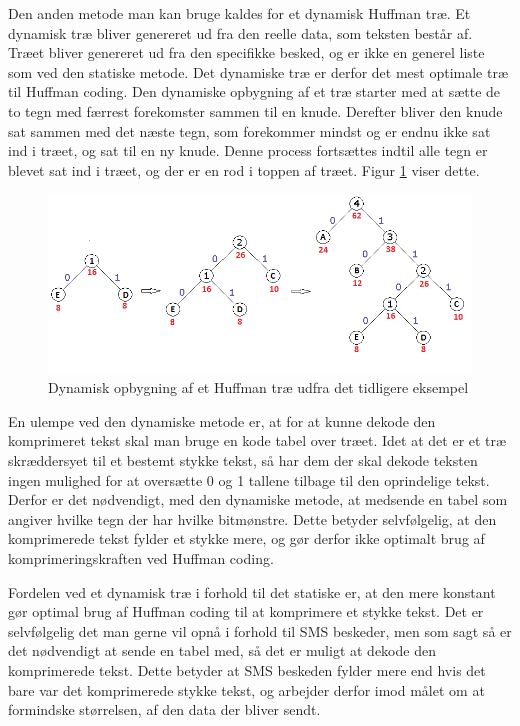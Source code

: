 Den anden metode man kan bruge kaldes for et dynamisk Huffman træ. Et dynamisk træ bliver genereret ud fra den reelle data, som teksten består af. Træet bliver genereret ud fra den specifikke besked, og er ikke en generel liste som ved den statiske metode. Det dynamiske træ er derfor det mest optimale træ til Huffman coding. Den dynamiske opbygning af et træ starter med at sætte de to tegn med færrest forekomster sammen til en knude. Derefter bliver den knude sat sammen med det næste tegn, som forekommer mindst og er endnu ikke sat ind i træet, og sat til en ny knude. Denne process fortsættes indtil alle tegn er blevet sat ind i træet, og der er en rod i toppen af træet. Figur \ref{fig:dynamic_tree} viser dette.

\begin{figure}[H]
\centering
\includegraphics[width=\linewidth]{Billeder/dynamisk.png}
\caption{Dynamisk opbygning af et Huffman træ udfra det tidligere eksempel \cite{Hufftree_1}}
\label{fig:dynamic_tree}
\end{figure}

En ulempe ved den dynamiske metode er, at for at kunne dekode den komprimeret tekst skal man bruge en kode tabel over træet. Idet at det er et træ skræddersyet til et bestemt stykke tekst, så har dem der skal dekode teksten ingen mulighed for at oversætte 0 og 1 tallene tilbage til den oprindelige tekst. Derfor er det nødvendigt, med den dynamiske metode, at medsende en tabel som angiver hvilke tegn der har hvilke bitmønstre. Dette betyder selvfølgelig, at den komprimerede tekst fylder et stykke mere, og gør derfor ikke optimalt brug af komprimeringskraften ved Huffman coding. \cite{Hufftree_4}

Fordelen ved et dynamisk træ i forhold til det statiske er, at den mere konstant gør optimal brug af Huffman coding til at komprimere et stykke tekst. Det er selvfølgelig det man gerne vil opnå i forhold til SMS beskeder, men som sagt så er det nødvendigt at sende en tabel med, så det er muligt at dekode den komprimerede tekst. Dette betyder at SMS beskeden fylder mere end hvis det bare var det komprimerede stykke tekst, og arbejder derfor imod målet om at formindske størrelsen, af den data der bliver sendt.